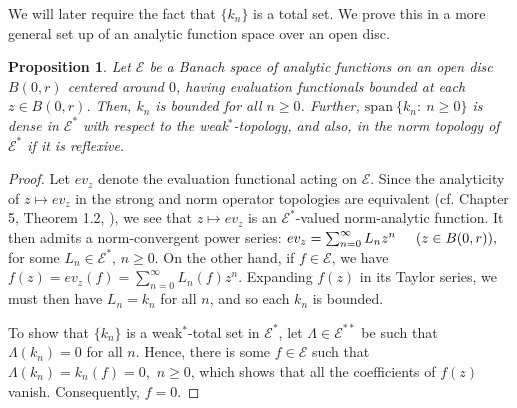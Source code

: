\documentclass[12pt, reqno]{amsart}
\newtheorem{proposition}[theorem]{Proposition}
\theoremstyle{definition}
\theoremstyle{remark}
\numberwithin{equation}{section}
\begin{document}
We will later require the fact that $\{k_n\}$ is a total set. We prove this in a more general set up of an analytic function space over an open disc.

\begin{proposition}\label{c-f}
    Let $\mathcal{E}$ be a Banach space of analytic functions on an open disc $B(0,r)$ centered around $0$, having evaluation functionals bounded at each $z\in B(0,r)$. Then, $k_n$ is bounded for all $n\geq 0$. Further, $\text{span}~ \big \{k_n:~n \geq 0\big \}$ is dense in $\mathcal{E}^*$ with respect to the weak$^*$-topology, and also, in the norm topology of $\mathcal{E}^*$ if it is reflexive.
\end{proposition}
\begin{proof}
    Let $ev_z$ denote the evaluation functional acting on $\mathcal{E}$. Since the  analyticity of $z\mapsto ev_z$ in the strong and norm operator topologies are equivalent (cf. Chapter 5, Theorem 1.2, \cite{Taylor}), we see that $z\mapsto ev_z$ is an $\mathcal{E}^*$-valued norm-analytic function. It then admits a norm-convergent power series:     $ev_z=\sum_{n=0}^{\infty} L_n z^n\hskip .5cm (z\in B(0,r)),$ for some $L_n\in \mathcal{E}^*$, $n\geq 0$. On the other hand, if $f\in \mathcal{E}$, we have $f(z)=ev_z(f)=\sum_{n=0}^{\infty} L_n(f)z^n.$ Expanding $f(z)$ in its Taylor series, we must then have $L_n=k_n$ for all $n$, and so each $k_{n}$ is bounded.

    To show that $\{k_n\}$ is a weak$^*$-total set in $\mathcal{E}^*$, let $\Lambda \in \mathcal{E}^{**}$ be such that $\Lambda(k_n)=0$ for all $n$. Hence, there is some $f\in \mathcal{E}$ such that 
    $\Lambda(k_n)=k_n(f)=0,$
 $n\geq 0$, which shows that all the coefficients of $f(z)$ vanish. Consequently, $f=0$.
    
\end{proof}
\end{document}
